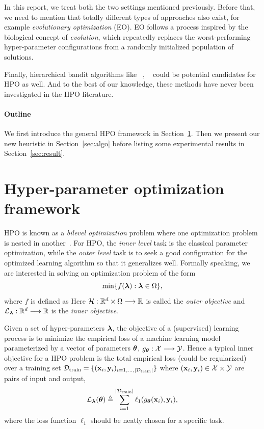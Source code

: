 \documentclass[twoside,11pt]{article}
\begin{document}
In this report, we treat both the two settings mentioned previously. Before that, we need to mention that totally different types of approaches also exist, for example \emph{evolutionary optimization} (EO). EO follows a process inspired by the biological concept of \emph{evolution}, which repeatedly replaces the worst-performing hyper-parameter configurations from a randomly initialized population of solutions.

Finally, hierarchical bandit algorithms like \HOO~\citep{bubeck2010x}, \HCT~\citep{azar2014online} could be potential candidates for HPO as well. And to the best of our knowledge, these methods have never been investigated in the HPO literature.

\paragraph{Outline} 

We first introduce the general HPO framework in Section~\ref{sec:framework}. Then we present our new heuristic in Section~\ref{sec:algo} before listing some experimental results in Section~\ref{sec:result}.

\section{Hyper-parameter optimization framework}\label{sec:framework}

HPO is known as a \emph{bilevel optimization} problem where one optimization problem is nested in another~\citep{franceschi2018bilevel,colson2007bilevel}. For HPO, the \emph{inner level} task is the classical parameter optimization, while the \emph{outer level} task is to seek a good configuration for the optimized learning algorithm so that it generalizes well. Formally speaking, we are interested in solving an optimization problem of the form
\[
	\min \{f({\boldsymbol \lambda}):{\boldsymbol \lambda}\in\Omega\},
\]
where $f$ is defined as  Here $\mathcal{H}:\mathbb{R}^d\times\Omega\longrightarrow\mathbb{R}$ is called the \emph{outer objective} and $\mathcal{L}_{{\boldsymbol \lambda}}:\mathbb{R}^d\longrightarrow\mathbb{R}$ is the \emph{inner objective}.

Given a set of hyper-parameters ${\boldsymbol \lambda}$, the objective of a (supervised) learning process is to minimize the empirical loss of a machine learning model parameterized by a vector of parameters ${\boldsymbol \theta}$, $g_{{\boldsymbol \theta}}:\mathcal{X}\longrightarrow\mathcal{Y}$. Hence a typical inner objective for a HPO problem is the total empirical loss (could be regularized) over a training set $\mathcal{D}_{\operatorname{train}} = \{({\bf x}_i,{\bf y}_i)_{i=1, \ldots, |\mathcal{D}_{\operatorname{train}}|}\}$ where $({\bf x}_i,{\bf y}_i)\in\mathcal{X}\times\mathcal{Y}$ are pairs of input and output,
\[
	\mathcal{L}_{{\boldsymbol \lambda}}({\boldsymbol \theta}) \triangleq \sum_{i=1}^{|\mathcal{D}_{\operatorname{train}}|} \ell_1(g_{{\boldsymbol \theta}}({\bf x}_i),{\bf y}_i),
\]
where the loss function $\ell_1$ should be neatly chosen for a specific task.
\end{document}
